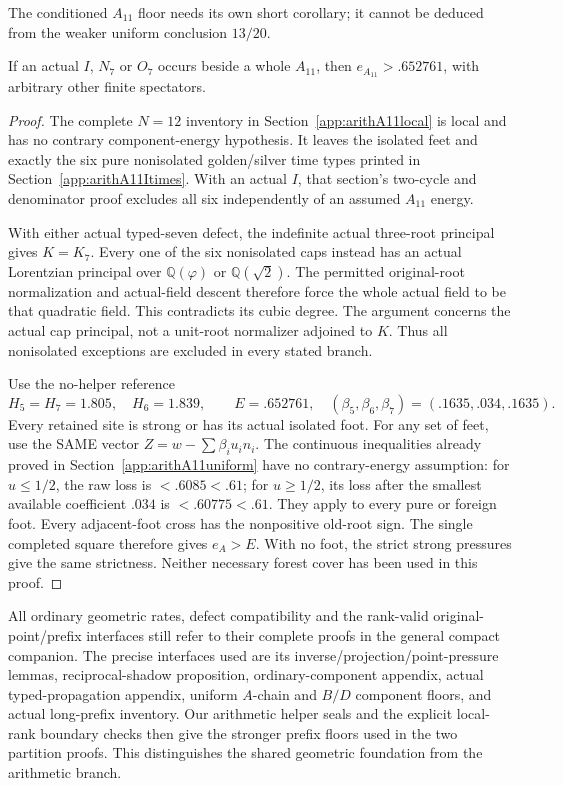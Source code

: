 The conditioned \(A_{11}\) floor
needs its own short corollary;
it cannot be deduced from the weaker
uniform conclusion \(13/20\).

\begin{corollary}\label{cor:arithA11conditionedcover}
If an actual \(I\), \(N_7\) or \(O_7\)
occurs beside a whole \(A_{11}\),
then \(e_{A_{11}}>.652761\),
with arbitrary other finite spectators.
\end{corollary}
\begin{proof}
The complete \(N=12\) inventory in
Section~\ref{app:arithA11local}
is local and has no contrary
component-energy hypothesis.
It leaves the isolated feet and
exactly the six pure nonisolated
golden/silver time types printed
in Section~\ref{app:arithA11Itimes}.
With an actual \(I\), that section's
two-cycle and denominator proof
excludes all six independently
of an assumed \(A_{11}\) energy.

With either actual typed-seven
defect, the indefinite actual
three-root principal gives \(K=K_7\).
Every one of the six nonisolated
caps instead has an actual
Lorentzian principal over
\(\mathbb Q(\varphi)\) or
\(\mathbb Q(\sqrt2)\).
The permitted original-root
normalization and actual-field
descent therefore force the whole
actual field to be that quadratic
field.
This contradicts its cubic degree.
The argument concerns the actual
cap principal, not a unit-root
normalizer adjoined to \(K\).
Thus all nonisolated exceptions
are excluded in every stated branch.

Use the no-helper reference
\[
 H_5=H_7=1.805,\quad H_6=1.839,\qquad
 E=.652761,\quad
       (\beta_5,\beta_6,\beta_7)=(.1635,.034,.1635).
\]
Every retained site is strong or
has its actual isolated foot.
For any set of feet, use the
SAME vector
\(Z=w-\sum\beta_i u_i n_i\).
The continuous inequalities already
proved in Section~\ref{app:arithA11uniform}
have no contrary-energy assumption:
for \(u\le1/2\), the raw loss is
\(<.6085<.61\);
for \(u\ge1/2\), its loss after
the smallest available coefficient
\(.034\) is \(<.60775<.61\).
They apply to every pure or
foreign foot.
Every adjacent-foot cross has
the nonpositive old-root sign.
The single completed square
therefore gives \(e_A>E\).
With no foot, the strict strong
pressures give the same strictness.
Neither necessary forest cover
has been used in this proof.
\end{proof}

All ordinary geometric rates,
defect compatibility and the
rank-valid original-point/prefix
interfaces still refer to their
complete proofs in the general
compact companion.
The precise interfaces used are
its inverse/projection/point-pressure
lemmas, reciprocal-shadow proposition,
ordinary-component appendix,
actual typed-propagation appendix,
uniform \(A\)-chain and \(B/D\)
component floors, and actual
long-prefix inventory.
Our arithmetic helper seals and
the explicit local-rank boundary
checks then give the stronger
prefix floors used in the two
partition proofs.
This distinguishes the shared
geometric foundation from the
arithmetic branch.

